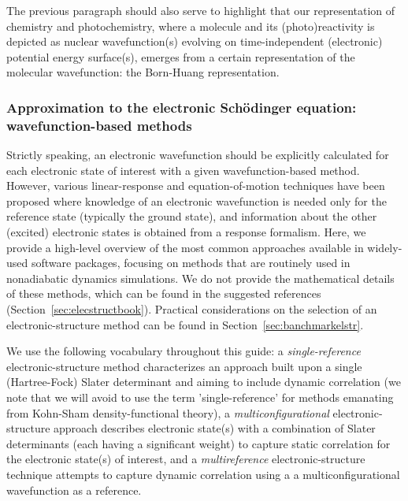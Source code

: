 \documentclass[9pt,bestpractices,pubversion]{livecoms}
\begin{document}
The previous paragraph should also serve to highlight that our representation of chemistry and photochemistry, where a molecule and its (photo)reactivity is depicted as nuclear wavefunction(s) evolving on time-independent (electronic) potential energy surface(s), emerges from a certain representation of the molecular wavefunction: the Born-Huang representation.

\subsubsection{Approximation to the electronic Sch\"{o}dinger equation: wavefunction-based methods}
\label{sec:wft}

Strictly speaking, an electronic wavefunction should be explicitly calculated for each electronic state of interest with a given wavefunction-based method. However, various linear-response and equation-of-motion techniques have been proposed where knowledge of an electronic wavefunction is needed only for the reference state (typically the ground state), and information about the other (excited) electronic states is obtained from a response formalism. Here, we provide a high-level overview of the most common approaches available in widely-used software packages, focusing on methods that are routinely used in nonadiabatic dynamics simulations.\cite{crespo2018recent,gonzalez2012progress} We do not provide the mathematical details of these methods, which can be found in the suggested references (Section~\ref{sec:elecstructbook}). Practical considerations on the selection of an electronic-structure method can be found in Section~\ref{sec:banchmarkelstr}. 

We use the following vocabulary throughout this guide: a \textit{single-reference} electronic-structure method characterizes an approach built upon a single (Hartree-Fock) Slater determinant and aiming to include dynamic correlation (we note that we will avoid to use the term 'single-reference' for methods emanating from Kohn-Sham density-functional theory), a \textit{multiconfigurational} electronic-structure approach describes electronic state(s) with a combination of Slater determinants (each having a significant weight) to capture static correlation for the electronic state(s) of interest, and a \textit{multireference} electronic-structure technique attempts to capture dynamic correlation using a a multiconfigurational wavefunction as a reference. 
\end{document}
